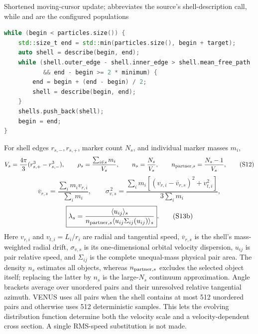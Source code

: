 {}
{Shortened moving-cursor update;  abbreviates the source's
 shell-description call, while  and  are the
 configured populations}
\begin{lstlisting}[language=C++]
while (begin < particles.size()) {
    std::size_t end = std::min(particles.size(), begin + target);
    auto shell = describe(begin, end);
    while (shell.outer_edge - shell.inner_edge > shell.mean_free_path
           && end - begin >= 2 * minimum) {
        end = begin + (end - begin) / 2;
        shell = describe(begin, end);
    }
    shells.push_back(shell);
    begin = end;
}
\end{lstlisting}

For shell edges \(r_{s,-},r_{s,+}\), marker count \(N_s\), and individual
marker masses \(m_i\),
\[
 V_s=\frac{4\pi}{3}(r_{s,+}^3-r_{s,-}^3),\qquad
 \rho_s=\frac{\sum_{i\in s}m_i}{V_s},\qquad
 n_s=\frac{N_s}{V_s},\qquad
 n_{{\rm partner},s}=\frac{N_s-1}{V_s},                    \tag{S12}
\]
\[
 \overline v_{r,s}=\frac{\sum_i m_i v_{r,i}}{\sum_i m_i},
 \qquad
 \sigma_{v,s}^{\,2}=
 \frac{\sum_i m_i[(v_{r,i}-\overline v_{r,s})^2+v_{t,i}^2]}
 {3\sum_i m_i},                                           \tag{S13a}
\]
\[
 \boxed{\displaystyle
 \lambda_s=
 \frac{\langle u_{ij}\rangle_s}
 {n_{{\rm partner},s}
  \langle u_{ij}\Sigma_{ij}(u_{ij})\rangle_s}}.             \tag{S13b}
\]
Here \(v_{r,i}\) and \(v_{t,i}=L_i/r_i\) are radial and tangential speed,
\(\overline v_{r,s}\) is the shell's mass-weighted radial drift,
\(\sigma_{v,s}\) is its one-dimensional orbital velocity dispersion,
\(u_{ij}\) is pair relative speed, and \(\Sigma_{ij}\) is the complete
unequal-mass physical pair area.  The density \(n_s\) estimates all objects,
whereas \(n_{{\rm partner},s}\) excludes the selected object itself; replacing
the latter by \(n_s\) is the large-\(N_s\) continuum approximation.  Angle
brackets average over unordered pairs and their unresolved relative
tangential azimuth.  VENUS uses all pairs when the shell contains at most 512
unordered pairs and otherwise uses 512 deterministic samples.  This
lets the evolving distribution function determine both the velocity scale
and a velocity-dependent cross section.  A single RMS-speed substitution is
not made.

